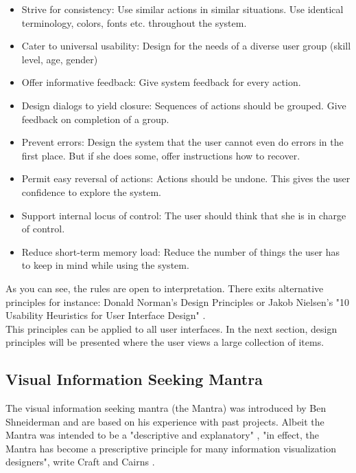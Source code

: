 \documentclass[11pt]{report}
\begin{document}
\begin{itemize}
	\item Strive for consistency: Use similar actions in similar situations. Use identical terminology, colors, fonts etc. throughout the system.	
	\item Cater to universal usability: Design for the needs of a diverse user group (skill level, age, gender)
	\item Offer informative feedback: Give system feedback for every action.
	\item Design dialogs to yield closure: Sequences of actions should be grouped. Give feedback on completion of a group.
	\item Prevent errors: Design the system that the user cannot even do errors in the first place. But if she does some, offer instructions how to recover.
	\item Permit easy reversal of actions: Actions should be undone. This gives the user confidence to explore the system.
	\item Support internal locus of control: The user should think that she is in charge of control.
	\item Reduce short-term memory load: Reduce the number of things the user has to keep in mind while using the system.
\end{itemize}

As you can see, the rules are open to interpretation. There exits alternative principles for instance: Donald Norman's Design Principles \cite{Norman2013} or Jakob Nielsen's "10 Usability Heuristics for User Interface Design" \cite{Nielsen1995}. \\

This principles can be applied to all user interfaces. In the next section, design principles will be presented where the user views a large collection of items.

\subsection{Visual Information Seeking Mantra}

The visual information seeking mantra (the Mantra) was introduced by Ben Shneiderman \cite{Shneiderman1996} and are based on his experience with past projects. Albeit the Mantra was intended to be a "descriptive and explanatory" \cite{Card1999}, "in effect, the Mantra has become a prescriptive principle for many information visualization designers", write Craft and Cairns \cite{Craft2005}. \\
\end{document}
